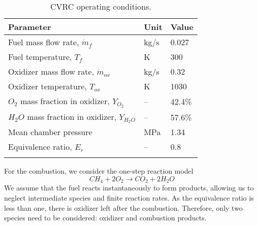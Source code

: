 \begin{table} [h]
	\centering
	\caption{CVRC operating conditions.}
	\centering
	\begin{tabular}{l l l}
		\toprule
		\centering
		Parameter & Unit & Value \\
		\midrule
		Fuel mass flow rate, $\dot{m}_{f}$ & kg/s & 0.027   \\
		Fuel temperature, $T_{f}$ & K & 300   \\
		Oxidizer mass flow rate, $\dot{m}_{ox}$ & kg/s & 0.32   \\
		Oxidizer temperature, $T_{ox}$ & K & 1030   \\
		$O_2$ mass fraction in oxidizer, $Y_{O_2}$ & -- & 42.4\%   \\
		$H_2O$ mass fraction in oxidizer, $Y_{H_2O}$ & -- & 57.6\%   \\
		Mean chamber pressure & MPa & 1.34 \\
		Equivalence ratio, $E_r$ & -- & 0.8 \\
		\bottomrule
		\label{tab:operating-conditions}
	\end{tabular} 
\end{table}
For the combustion, we consider the one-step reaction model
\begin{equation*}\label{eq:combustion}
CH_4 + 2O_2 \rightarrow CO_2 + 2H_2O
\end{equation*}
We assume that the fuel reacts instantaneously to form products, allowing us to neglect intermediate species and finite reaction rates. As the equivalence ratio is less than one, there is oxidizer left after the combustion. Therefore, only two species need to be considered: oxidizer and combustion products.


